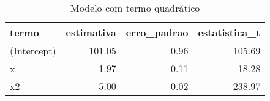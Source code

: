 \begin{table}

\caption{\label{tab:tabela2_exemplo4}Modelo com termo quadrático}
\centering
\begin{tabular}[t]{l|r|r|r}
\hline
termo & estimativa & erro\_padrao & estatistica\_t\\
\hline
(Intercept) & 101.05 & 0.96 & 105.69\\
\hline
x & 1.97 & 0.11 & 18.28\\
\hline
x2 & -5.00 & 0.02 & -238.97\\
\hline
\end{tabular}
\end{table}
